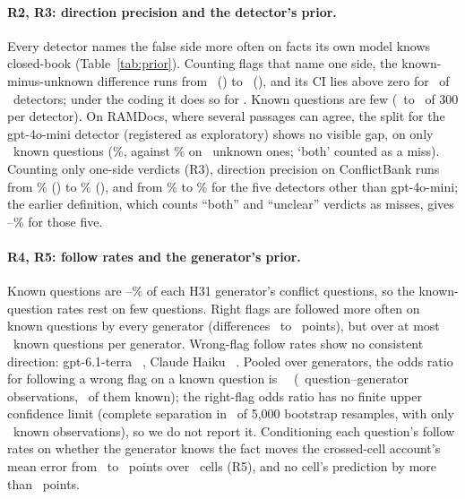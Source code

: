 \paragraph{R2, R3: direction precision and the detector's prior.} Every detector names the false side more often on
facts its own model knows closed-book (Table~\ref{tab:prior}). Counting flags that name one side, the known-minus-unknown
difference runs from \priorSsDiffMin\ (\priorSsDiffMinDet) to \priorSsDiffMax\ (\priorSsDiffMaxDet), and its CI lies
above zero for \priorSsDiffPos\ of \priorN\ detectors; under the  coding it does so for
\priorDirDiffPos. Known questions are few (\priorKnownQMini\ to \priorKnownQFour\ of 300 per detector). On RAMDocs,
where several passages can agree, the  split for the gpt-4o-mini detector (registered as exploratory)
shows no visible gap, on only \cbkRdKnownN\ known questions (\cbkRdKnownDir\%, against \cbkRdUnknownDir\% on
\cbkRdUnknownN\ unknown ones; `both' counted as a miss). Counting
only one-side verdicts (R3), direction precision on ConflictBank runs from \ssPrecMin\% (\ssPrecMinDet) to
\ssPrecMax\% (\ssPrecMaxDet), and from \ssPrecOtherMin\% to \ssPrecOtherMax\% for the five detectors other than
gpt-4o-mini; the earlier definition, which counts ``both'' and ``unclear'' verdicts as misses, gives
\dirPrecOtherMin--\dirPrecOtherMax\% for those five.

\paragraph{R4, R5: follow rates and the generator's prior.} Known questions are \prFolKnownShareMin--\prFolKnownShareMax\%
of each H31 generator's conflict questions, so the known-question rates rest on few questions. Right flags are
followed more often on known questions by every generator (differences \prFolRDiffLuna\ to \prFolRDiffHaiku\ points),
but over at most \prFolRKnownMiniN\ known questions per generator. Wrong-flag follow rates show no consistent
direction: gpt-6.1-terra \prFolWDiffTerra\ \prFolWDiffTerraCI, Claude Haiku \prFolWDiffHaiku\ \prFolWDiffHaikuCI.
Pooled over generators, the odds ratio for following a wrong flag on a known question is \prFolOrW\ \prFolOrWCI\
(\prFolOrWN\ question--generator observations, \prFolOrWKnownN\ of them known); the right-flag odds ratio has no
finite upper confidence limit (complete separation in \prFolOrRSeparated\ of 5,000 bootstrap resamples, with only
\prFolOrRKnownN\ known observations), so we do not report it. Conditioning each question's follow rates on whether the generator
knows the fact moves the crossed-cell account's mean error from \uncondMaeAll\ to \condMaeAll\ points over
\condNAll\ cells (R5), and no cell's prediction by more than \condMaxShift\ points.

